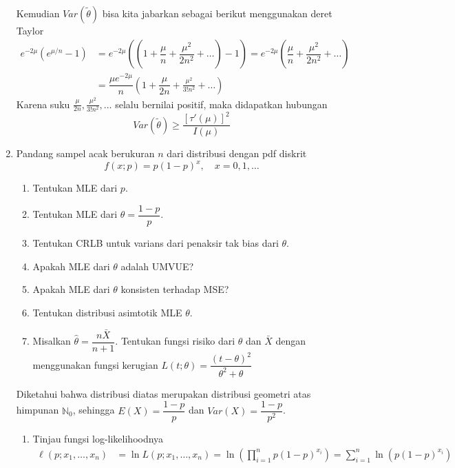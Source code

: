 \documentclass{exam}
\newcommand{\N}{\mathbb{N}}
\begin{document}
\begin{enumerate}
\begin{solution}
\begin{align*}
        \end{align*}
        Kemudian $Var(\tilde{\theta})$ bisa kita jabarkan sebagai berikut menggunakan deret Taylor
        \begin{align*}
            e^{-2\mu}\left(e^{\mu/n}-1\right)&= e^{-2\mu}\left(\left(1+\dfrac{\mu}{n}+\dfrac{\mu^2}{2n^2}+\ldots\right)-1\right) = e^{-2\mu}\left(\dfrac{\mu}{n}+\dfrac{\mu^2}{2n^2}+\ldots\right)\\
            &= \dfrac{\mu e^{-2\mu}}{n}\left(1+\dfrac{\mu}{2n}+\frac{\mu^2}{3!n^2}+\ldots\right)
        \end{align*}
        Karena suku $\frac{\mu}{2n},\frac{\mu^2}{3!n^2},\ldots$ selalu bernilai positif, maka didapatkan hubungan
        \[Var(\tilde{\theta}) \geq \frac{[\tau'(\mu)]^2}{I(\mu)}\]
    \end{solution}
    \item Pandang sampel acak berukuran $n$ dari distribusi dengan pdf diskrit
    \[
    f(x; p) = p(1 - p)^x, \quad x = 0, 1, \ldots
    \]
    \begin{enumerate}
        \item Tentukan MLE dari $p$.
        \item Tentukan MLE dari $\theta = \dfrac{1 - p}{p}$.
        \item Tentukan CRLB untuk varians dari penaksir tak bias dari $\theta$.
        \item Apakah MLE dari $\theta$ adalah UMVUE?
        \item Apakah MLE dari $\theta$ konsisten terhadap MSE?
        \item Tentukan distribusi asimtotik MLE $\theta$.
        \item Misalkan $\hat{\theta} = \dfrac{n \bar{X}}{n + 1}$. Tentukan fungsi risiko dari $\hat{\theta}$ dan $\bar{X}$ dengan menggunakan fungsi kerugian $L(t; \theta) = \dfrac{(t - \theta)^2}{\theta^2 + \theta}$  
    \end{enumerate}
    \begin{solution}
        Diketahui bahwa distribusi diatas merupakan distribusi geometri atas himpunan $\N_0$, sehingga $E(X) = \dfrac{1-p}{p}$ dan $Var(X) = \dfrac{1-p}{p^2}$. 
        \begin{enumerate}
            \item Tinjau fungsi log-likelihoodnya
            \begin{align*}
                \ell(p; x_1,\dots,x_n) &= \ln L(p; x_1,\dots,x_n) = \ln\left(\prod_{i=1}^n p(1-p)^{x_i}\right) = \sum_{i=1}^n \ln\left(p(1-p)^{x_i}\right)\\

\end{align*}
\end{enumerate}
\end{solution}
\end{enumerate}
\end{document}
